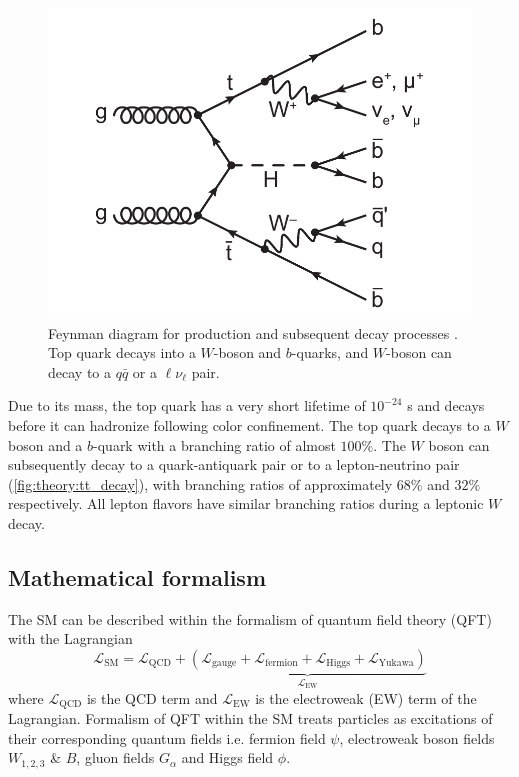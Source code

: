 \documentclass[../thesis.tex]{subfiles}
\begin{document}
\begin{figure}[!htb]
\begin{center}
\includegraphics[width=0.7\linewidth]{fig/theory_tt_decay.pdf}
\caption[Feynman diagram for \ttbar production and subsequent decay processes. Top quark decays into a $W$-boson and $b$-quarks, and $W$-boson can decay to a $q\bar{q}$ or a $\ell\nu_\ell$ pair.]{\label{fig:theory:tt_decay}Feynman diagram for \ttbar production and subsequent decay processes \citep{theory:ttH_Hbb}. Top quark decays into a $W$-boson and $b$-quarks, and $W$-boson can decay to a $q\bar{q}$ or a $\ell\nu_\ell$ pair.}
\end{center}
\end{figure}

Due to its mass, the top quark has a very short lifetime of $10^{-24}$ s \citep{PDG} and decays before it can hadronize following color confinement. The top quark decays to a $W$ boson and a $b$-quark with a branching ratio of almost $100\%$. The $W$ boson can subsequently decay to a quark-antiquark pair or to a lepton-neutrino pair (\autoref{fig:theory:tt_decay}), with branching ratios of approximately $68\%$ and $32\%$ respectively. All lepton flavors have similar branching ratios during a leptonic $W$ decay.



\subsection{Mathematical formalism}
The \acs{SM} can be described within the formalism of quantum field theory (\acs{QFT}) with the Lagrangian \citep{GrossmanNir2023}
\begin{equation}
\mathcal{L}_\mathrm{SM} = \mathcal{L}_\mathrm{QCD} + {\underbrace{(\mathcal{L}_\mathrm{gauge}+\mathcal{L}_\mathrm{fermion}+\mathcal{L}_\mathrm{Higgs}+\mathcal{L}_\mathrm{Yukawa})}_{\mathcal{L}_\mathrm{EW}}}
\end{equation}
where $\mathcal{L}_\mathrm{QCD}$ is the \acs{QCD} term and $\mathcal{L}_\mathrm{EW}$ is the electroweak (\acs{EW}) term of the Lagrangian. Formalism of \acs{QFT} within the \acs{SM} treats particles as excitations \citep{theory:qft} of their corresponding quantum fields i.e. fermion field $\psi$, electroweak boson fields $W_{1,2,3}$ \& $B$, gluon fields $G_\alpha$ and Higgs field $\phi$.
\end{document}
